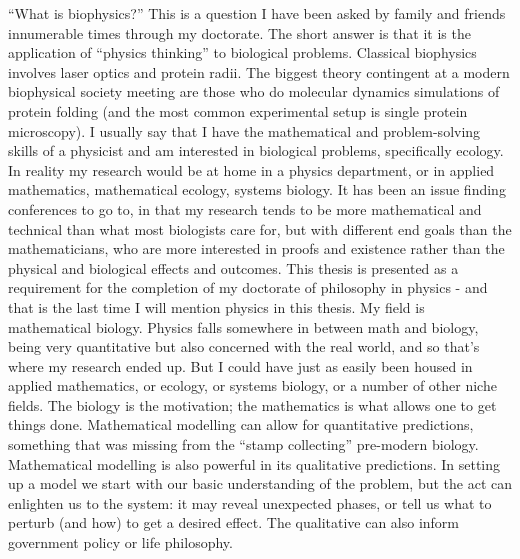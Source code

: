 \documentclass{ut-thesis}
\begin{document}
\begin{preliminary}


\iffalse
\begin{acknowledgements}
``What is biophysics?''
This is a question I have been asked by family and friends innumerable times through my doctorate. 
The short answer is that it is the application of ``physics thinking'' to biological problems. 
Classical biophysics involves laser optics and protein radii. 
The biggest theory contingent at a modern biophysical society meeting are those who do molecular dynamics simulations of protein folding (and the most common experimental setup is single protein microscopy). 
I usually say that I have the mathematical and problem-solving skills of a physicist and am interested in biological problems, specifically ecology. 
In reality my research would be at home in a physics department, or in applied mathematics, mathematical ecology, systems biology. 
It has been an issue finding conferences to go to, in that my research tends to be more mathematical and technical than what most biologists care for, but with different end goals than the mathematicians, who are more interested in proofs and existence rather than the physical and biological effects and outcomes. 
This thesis is presented as a requirement for the completion of my doctorate of philosophy in physics - and that is the last time I will mention physics in this thesis. 
My field is mathematical biology. 
Physics falls somewhere in between math and biology, being very quantitative but also concerned with the real world, and so that’s where my research ended up. 
But I could have just as easily been housed in applied mathematics, or ecology, or systems biology, or a number of other niche fields. 
The biology is the motivation; the mathematics is what allows one to get things done. 
Mathematical modelling can allow for quantitative predictions, something that was missing from the “stamp collecting” pre-modern biology. 
Mathematical modelling is also powerful in its qualitative predictions. 
In setting up a model we start with our basic understanding of the problem, but the act can enlighten us to the system: it may reveal unexpected phases, or tell us what to perturb (and how) to get a desired effect. %
The qualitative can also inform government policy or life philosophy. %


\end{acknowledgements}
\end{preliminary}
\end{document}
